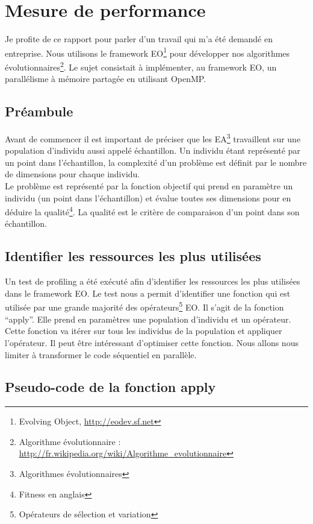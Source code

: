 \section{Mesure de performance}

Je profite de ce rapport pour parler d'un travail qui m'a été demandé en entreprise. Nous utilisons le framework EO\footnote{Evolving Object, \url{http://eodev.sf.net}} pour développer nos algorithmes évolutionnaires\footnote{Algorithme évolutionnaire : \url{http://fr.wikipedia.org/wiki/Algorithme_evolutionnaire}}. Le sujet consistait à implémenter, au framework EO, un parallélisme à mémoire partagée en utilisant OpenMP.

\subsection{Préambule}

Avant de commencer il est important de préciser que les EA\footnote{Algorithmes évolutionnaires} travaillent sur une population d'individu aussi appelé échantillon. Un individu étant représenté par un point dans l'échantillon, la complexité d'un problème est définit par le nombre de dimensions pour chaque individu.\\

Le problème est représenté par la fonction objectif qui prend en paramètre un individu (un point dans l'échantillon) et évalue toutes ses dimensions pour en déduire la qualité\footnote{Fitness en anglais}. La qualité est le critère de comparaison d'un point dans son échantillon.

\subsection{Identifier les ressources les plus utilisées}

Un test de profiling a été exécuté afin d'identifier les ressources les plus utilisées dans le framework EO. Le test nous a permit d'identifier une fonction qui est utilisée par une grande majorité des opérateurs\footnote{Opérateurs de sélection et variation} EO. Il s'agit de la fonction ``apply''. Elle prend en paramètres une population d'individu et un opérateur. Cette fonction va itérer sur tous les individus de la population et appliquer l'opérateur. Il peut être intéressant d'optimiser cette fonction. Nous allons nous limiter à transformer le code séquentiel en parallèle.

\subsection{Pseudo-code de la fonction apply}

